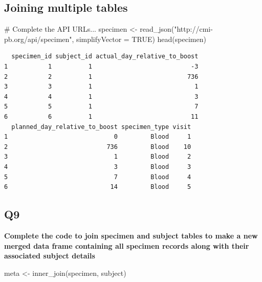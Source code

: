 \documentclass[
  letterpaper,
  DIV=11,
  numbers=noendperiod]{scrartcl}
\newenvironment{Shaded}{\begin{snugshade}}{\end{snugshade}}
\newcommand{\AttributeTok}[1]{\textcolor[rgb]{0.40,0.45,0.13}{#1}}
\newcommand{\CommentTok}[1]{\textcolor[rgb]{0.37,0.37,0.37}{#1}}
\newcommand{\ConstantTok}[1]{\textcolor[rgb]{0.56,0.35,0.01}{#1}}
\newcommand{\FunctionTok}[1]{\textcolor[rgb]{0.28,0.35,0.67}{#1}}
\newcommand{\NormalTok}[1]{\textcolor[rgb]{0.00,0.23,0.31}{#1}}
\newcommand{\OtherTok}[1]{\textcolor[rgb]{0.00,0.23,0.31}{#1}}
\newcommand{\StringTok}[1]{\textcolor[rgb]{0.13,0.47,0.30}{#1}}
\begin{document}
\hypertarget{joining-multiple-tables}{%
\subsection{Joining multiple tables}\label{joining-multiple-tables}}

\begin{Shaded}
\begin{Highlighting}[]
\CommentTok{\# Complete the API URLs...}
\NormalTok{specimen }\OtherTok{\textless{}{-}} \FunctionTok{read\_json}\NormalTok{(}\StringTok{"http://cmi{-}pb.org/api/specimen"}\NormalTok{, }\AttributeTok{simplifyVector =} \ConstantTok{TRUE}\NormalTok{)}
\FunctionTok{head}\NormalTok{(specimen)}
\end{Highlighting}
\end{Shaded}

\begin{verbatim}
  specimen_id subject_id actual_day_relative_to_boost
1           1          1                           -3
2           2          1                          736
3           3          1                            1
4           4          1                            3
5           5          1                            7
6           6          1                           11
  planned_day_relative_to_boost specimen_type visit
1                             0         Blood     1
2                           736         Blood    10
3                             1         Blood     2
4                             3         Blood     3
5                             7         Blood     4
6                            14         Blood     5
\end{verbatim}

\hypertarget{q9-1}{%
\subsection{Q9}\label{q9-1}}

\textbf{Complete the code to join specimen and subject tables to make a
new merged data frame containing all specimen records along with their
associated subject details}

\begin{Shaded}
\begin{Highlighting}[]
\NormalTok{meta }\OtherTok{\textless{}{-}} \FunctionTok{inner\_join}\NormalTok{(specimen, subject)}
\end{Highlighting}
\end{Shaded}
\end{document}

